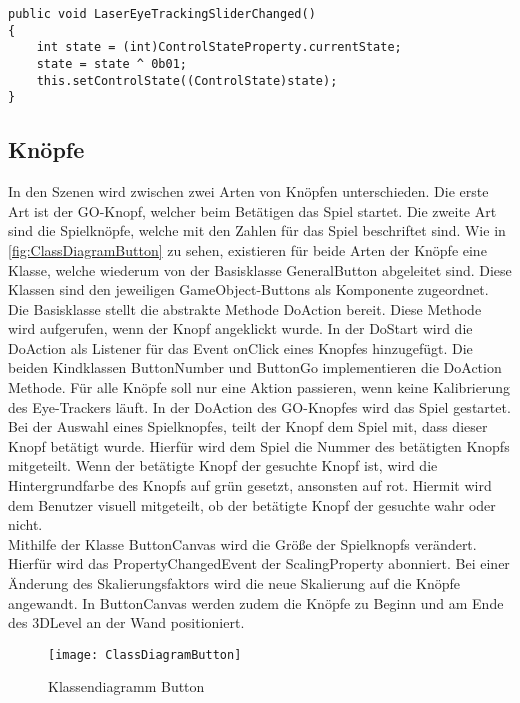 \begin{lstlisting}[caption=Method LaserEyeTrackingSliderChanged,label=lstlisting:LaserEyeTracking]
public void LaserEyeTrackingSliderChanged()
{
    int state = (int)ControlStateProperty.currentState;
    state = state ^ 0b01;
    this.setControlState((ControlState)state);
}
\end{lstlisting}

\subsection{Knöpfe}
In den Szenen wird zwischen zwei Arten von Knöpfen unterschieden. Die erste Art ist der GO-Knopf, welcher beim Betätigen das Spiel startet. Die zweite Art sind die Spielknöpfe, welche mit den Zahlen für das Spiel beschriftet sind. Wie in \autoref{fig:ClassDiagramButton} zu sehen, existieren für beide Arten der Knöpfe eine Klasse, welche wiederum von der Basisklasse {\ttfamily GeneralButton} abgeleitet sind. Diese Klassen sind den jeweiligen GameObject-Buttons als Komponente zugeordnet. Die Basisklasse stellt die abstrakte Methode {\ttfamily DoAction} bereit. Diese Methode wird aufgerufen, wenn der Knopf angeklickt wurde. In der {\ttfamily DoStart} wird die {\ttfamily DoAction} als Listener für das Event {\ttfamily onClick} eines Knopfes hinzugefügt. Die beiden Kindklassen {\ttfamily ButtonNumber} und {\ttfamily ButtonGo} implementieren die {\ttfamily DoAction} Methode. Für alle Knöpfe soll nur eine Aktion passieren, wenn keine Kalibrierung des Eye-Trackers läuft. In der {\ttfamily DoAction} des GO-Knopfes wird das Spiel gestartet. Bei der Auswahl eines Spielknopfes, teilt der Knopf dem Spiel mit, dass dieser Knopf betätigt wurde. Hierfür wird dem Spiel die Nummer des betätigten Knopfs mitgeteilt. Wenn der betätigte Knopf der gesuchte Knopf ist, wird die Hintergrundfarbe des Knopfs auf grün gesetzt, ansonsten auf rot. Hiermit wird dem Benutzer visuell mitgeteilt, ob der betätigte Knopf der gesuchte wahr oder nicht. \\
Mithilfe der Klasse {\ttfamily ButtonCanvas} wird die Größe der Spielknopfs verändert. Hierfür wird das {\ttfamily PropertyChangedEvent} der {\ttfamily ScalingProperty} abonniert. Bei einer Änderung des Skalierungsfaktors wird die neue Skalierung auf die Knöpfe angewandt. In {\ttfamily ButtonCanvas} werden zudem die Knöpfe zu Beginn und am Ende des 3DLevel an der Wand positioniert. 

\begin{figure}[!htbp]
	\centering
	\texttt{[image: ClassDiagramButton]}
	\caption[Klassendiagramm Button]{Klassendiagramm Button}
	\label{fig:ClassDiagramButton}
\end{figure}

